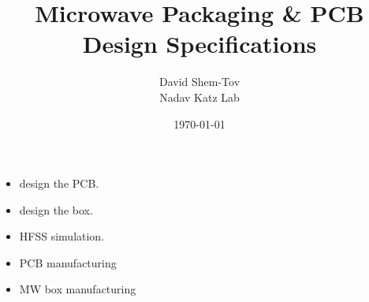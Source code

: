 \documentclass[11pt,a4paper]{article}
\title{\textbf{Microwave Packaging \& PCB Design Specifications}}
\author{David Shem-Tov\\{\small Nadav Katz Lab}}
\date{\today}
\newcommand{\boxedsymbol}[2][1em]{%
  \begingroup
  \setlength{\fboxsep}{0pt}
  \framebox{%
    \makebox[#1][c]{%
      \rule[-0.25\dimexpr#1\relax]{0pt}{#1}%
      #2%
    }%
  }%
  \endgroup
}
\newcommand{\notstarted}{\boxedsymbol{}}
\newcommand{\inprogress}{\textcolor{blue}{\boxedsymbol{$\rightarrow$}}}
\begin{document}
\maketitle

\begin{itemize}
    \item[\inprogress] design the PCB.
    \item[\notstarted] design the box.
    \item[\notstarted] HFSS simulation.
    \item[\notstarted] PCB manufacturing
    \item[\notstarted] MW box manufacturing
\end{itemize}





\end{document}
